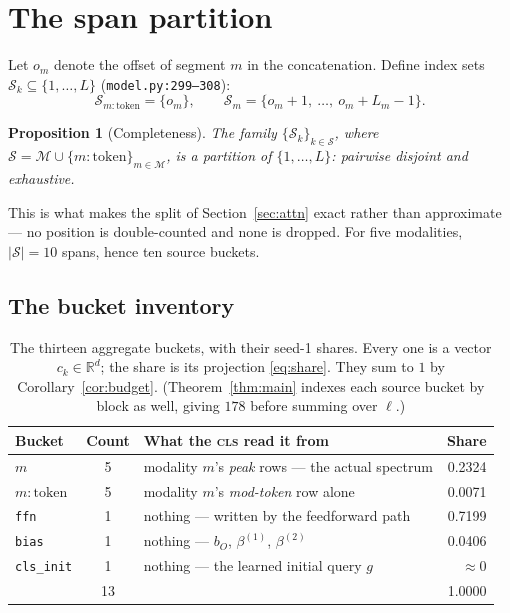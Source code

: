 \documentclass[11pt]{article}
\theoremstyle{plain}
\newtheorem{proposition}{Proposition}
\theoremstyle{remark}
\newcommand{\R}{\mathbb{R}}
\newcommand{\Mset}{\mathcal{M}}
\newcommand{\Sset}{\mathcal{S}}
\newcommand{\code}[1]{\texttt{\small #1}}
\begin{document}
\section{The span partition}

Let $o_m$ denote the offset of segment $m$ in the concatenation. Define index
sets $\Sset_k \subseteq \{1,\dots,L\}$ (\code{model.py:299--308}):
\[
  \Sset_{m:\text{token}} = \{o_m\},
  \qquad
  \Sset_{m} = \{o_m+1,\ \dots,\ o_m + L_m - 1\}.
\]

\begin{proposition}[Completeness]
\label{prop:partition}
The family $\{\Sset_k\}_{k \in \Sset}$, where
$\Sset = \Mset \cup \{m{:}\text{token}\}_{m\in\Mset}$, is a \emph{partition} of
$\{1,\dots,L\}$: pairwise disjoint and exhaustive.
\end{proposition}

\noindent
This is what makes the split of Section~\ref{sec:attn} exact rather than
approximate --- no position is double-counted and none is dropped. For five
modalities, $\lvert\Sset\rvert = 10$ spans, hence ten source buckets.

\subsection{The bucket inventory}

\begin{table}[htbp]
\centering
\small
\caption{The thirteen aggregate buckets, with their seed-1 shares. Every one
is a vector $c_k \in \R^d$; the share is its projection \eqref{eq:share}. They
sum to $1$ by Corollary~\ref{cor:budget}. (Theorem~\ref{thm:main} indexes each
source bucket by block as well, giving $178$ before summing over $\ell$.)}
\label{tab:buckets}
\renewcommand{\arraystretch}{1.15}
\begin{tabular}{@{}l c p{6.1cm} r@{}}
\toprule
Bucket & Count & What the \textsc{cls} read it from & Share \\
\midrule
$m$ & 5 & modality $m$'s \emph{peak} rows --- the actual spectrum & 0.2324 \\
$m{:}\text{token}$ & 5 & modality $m$'s \emph{mod-token} row alone & 0.0071 \\
\code{ffn} & 1 & nothing --- written by the feedforward path & 0.7199 \\
\code{bias} & 1 & nothing --- $b_O$, $\beta^{(1)}$, $\beta^{(2)}$ & 0.0406 \\
\code{cls\_init} & 1 & nothing --- the learned initial query $g$ & $\approx 0$ \\
\midrule
& 13 & & 1.0000 \\
\bottomrule
\end{tabular}
\end{table}
\end{document}
